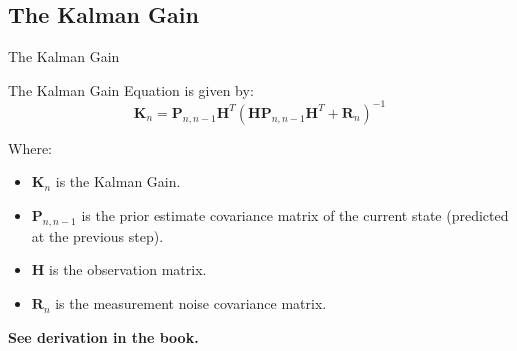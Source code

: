 \subsection{The Kalman Gain}
\begin{frame}{The Kalman Gain}
\begin{minipage}{1\linewidth} 
\begin{exampleblock}{}{
The Kalman Gain Equation is given by:
\begin{equation*}
\mathbf{K}_n = \mathbf{P}_{n,n-1}\mathbf{H}^T \left( \mathbf{H}\mathbf{P}_{n,n-1}\mathbf{H}^T + \mathbf{R}_n \right)^{-1} \tag{5}
\end{equation*}

Where:
\begin{itemize}
    \item $\mathbf{K}_n$ is the Kalman Gain.
    \item $\mathbf{P}_{n,n-1}$ is the prior estimate covariance matrix of the current state (predicted at the previous step).
    \item $\mathbf{H}$ is the observation matrix.
    \item $\mathbf{R}_n$ is the measurement noise covariance matrix.
\end{itemize}}
\end{exampleblock}
\end{minipage}

\textbf{See derivation in the book.}
\end{frame}

